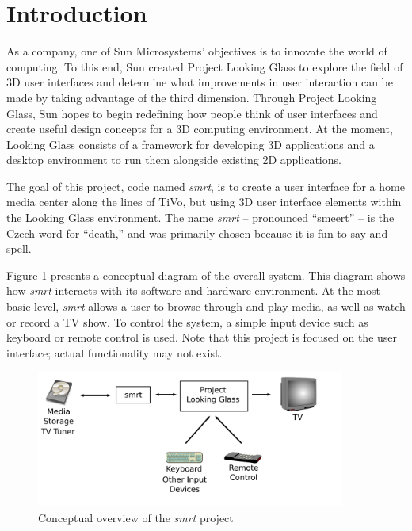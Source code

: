 \section{Introduction}
As a company, one of Sun Microsystems' objectives is to innovate the world of
computing. To this end, Sun created Project Looking Glass to explore the field
of 3D user interfaces and determine what improvements in user interaction can be
made by taking advantage of the third dimension. Through Project Looking Glass,
Sun hopes to begin redefining how people think of user interfaces and create
useful design concepts for a 3D computing environment. At the moment, Looking
Glass consists of a framework for developing 3D applications and a desktop
environment to run them alongside existing 2D applications.

The goal of this project, code named \textit{smrt}, is to create a user
interface for a home media center along the lines of TiVo, but using 3D user
interface elements within the Looking Glass environment. The name \textit{smrt}
-- pronounced ``smeert'' -- is the Czech word for ``death,'' and was primarily
chosen because it is fun to say and spell.

Figure \ref{figure:concept} presents a conceptual diagram of the overall
system.  This diagram shows how \textit{smrt} interacts with its software and
hardware environment. At the most basic level, \textit{smrt} allows a user to
browse through and play media, as well as watch or record a TV show.  To control
the system, a simple input device such as keyboard or remote control is used.
Note that this project is focused on the user interface; actual functionality
may not exist.

\begin{figure}[htb]
\centering
\includegraphics[width=4in]{figures/conceptual_overview}
\caption{Conceptual overview of the \textit{smrt} project\label{figure:concept}}
\end{figure}
